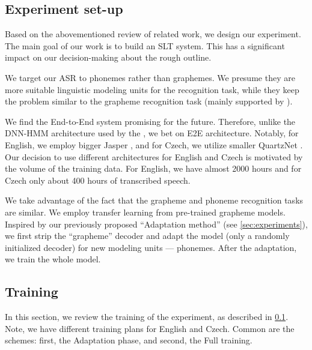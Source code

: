 \subsection{Experiment set-up}
\label{asr:phon:experiment}
Based on the abovementioned review of related work, we design our experiment. The main goal of our work is to build an SLT system. This has a significant impact on our decision-making about the rough outline.

We target our ASR to phonemes rather than graphemes. We presume they are more suitable linguistic modeling units for the recognition task, while they keep the problem similar to the grapheme recognition task (mainly supported by  ). 

We find the End-to-End system promising for the future. Therefore, unlike the DNN-HMM architecture used by the , we bet on E2E architecture. Notably, for English, we employ bigger Jasper , and for Czech, we utilize smaller QuartzNet . Our decision to use different architectures for English and Czech is motivated by the volume of the training data. For English, we have almost 2000 hours and for Czech only about 400 hours of transcribed speech.

We take advantage of the fact that the grapheme and phoneme recognition tasks are similar. We employ transfer learning from pre-trained grapheme models. Inspired by our previously proposed ``Adaptation method'' (see \cref{sec:experiments}), we first strip the ``grapheme'' decoder and adapt the model (only a randomly initialized decoder) for new modeling units --- phonemes. After the adaptation, we train the whole model.

\subsection{Training}
\label{asr:phon:training}
In this section, we review the training of the experiment, as described in \cref{asr:phon:experiment}. Note, we have different training plans for English and Czech. Common are the schemes: first, the Adaptation phase, and second, the Full training.

